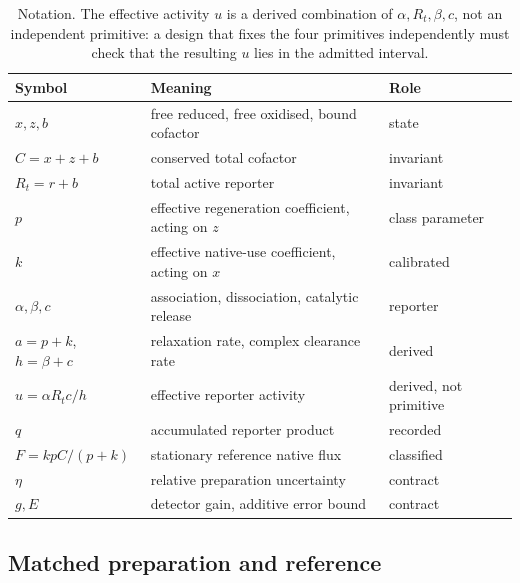 \documentclass[11pt]{article}
\theoremstyle{definition}
\theoremstyle{remark}
\begin{document}
\begin{table}[ht]
\centering\small
\begin{tabularx}{\textwidth}{llY}
\toprule
Symbol & Meaning & Role \\
\midrule
$x,z,b$ & free reduced, free oxidised, bound cofactor & state \\
$C=x+z+b$ & conserved total cofactor & invariant \\
$R_t=r+b$ & total active reporter & invariant \\
$p$ & effective regeneration coefficient, acting on $z$ & class parameter \\
$k$ & effective native-use coefficient, acting on $x$ & calibrated \\
$\alpha,\beta,c$ & association, dissociation, catalytic release & reporter \\
$a=p+k$, $h=\beta+c$ & relaxation rate, complex clearance rate & derived \\
$u=\alpha R_t c/h$ & effective reporter activity & derived, not primitive \\
$q$ & accumulated reporter product & recorded \\
$F=kpC/(p+k)$ & stationary reference native flux & classified \\
$\eta$ & relative preparation uncertainty & contract \\
$g,E$ & detector gain, additive error bound & contract \\
\bottomrule
\end{tabularx}
\caption{Notation. The effective activity $u$ is a derived combination of
$\alpha,R_t,\beta,c$, not an independent primitive: a design that fixes the four
primitives independently must check that the resulting $u$ lies in the admitted
interval.}
\label{tab:symbols}
\end{table}

\subsection{Matched preparation and reference}
\end{document}
